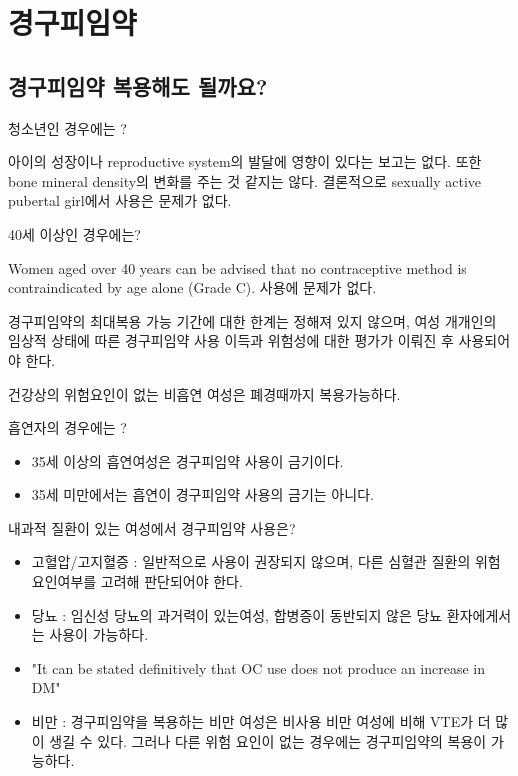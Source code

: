 \section{경구피임약}
\subsection{경구피임약 복용해도 될까요?}
청소년인 경우에는 ?
\begin{quotebox}
아이의 성장이나 reproductive system의 발달에 영향이 있다는 보고는 없다. 또한 bone mineral density의 변화를 주는 것 같지는 않다. 결론적으로 sexually active pubertal girl에서 사용은 문제가 없다.
\end{quotebox}
40세 이상인 경우에는?
\begin{quotebox}
Women aged over 40 years can be advised that no contraceptive method is contraindicated by age alone (Grade C). 사용에 문제가 없다.\par
경구피임약의 최대복용 가능 기간에 대한 한계는 정해져 있지 않으며, 여성 개개인의 임상적 상태에 따른 경구피임약 사용 이득과 위험성에 대한 평가가 이뤄진 후 사용되어야 한다.\par
건강상의 위험요인이 없는 비흡연 여성은 폐경때까지 복용가능하다.
\end{quotebox}
흡연자의 경우에는 ?
\begin{quotebox}
\begin{itemize}\tightlist
\item 35세 이상의 흡연여성은 경구피임약 사용이 금기이다.
\item 35세 미만에서는 흡연이 경구피임약 사용의 금기는 아니다.
\end{itemize}
\end{quotebox}
내과적 질환이 있는 여성에서 경구피임약 사용은?
\begin{quotebox}
\begin{itemize}\tightlist
\item 고혈압/고지혈증 : 일반적으로 사용이 권장되지 않으며, 다른 심혈관 질환의 위험 요인여부를 고려해 판단되어야 한다.
\item 당뇨 : 임신성 당뇨의 과거력이 있는여성, 합병증이 동반되지 않은 당뇨 환자에게서는 사용이 가능하다.
\item "It can be stated definitively that OC use does not produce an increase in DM"
\item 비만 : 경구피임약을 복용하는 비만 여성은 비사용 비만 여성에 비해 VTE가 더 많이 생길 수 있다. 그러나 다른 위험 요인이 없는 경우에는 경구피임약의 복용이 가능하다.
\end{itemize}
\end{quotebox}

